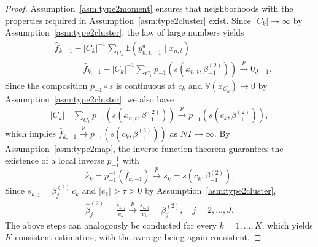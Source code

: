 \documentclass[preprint,12pt,authoryear]{elsarticle}
\newcommand{\pto}{\xrightarrow{p}}
\newcommand{\E}{\mathbb{E}}
\newcommand{\Var}{\mathbb{V}}
\begin{document}
\begin{proof}
Assumption~\ref{asm:type2moment} ensures that neighborhoods with the properties required in Assumption~\ref{asm:type2cluster} exist. Since $\lvert C_k \rvert \to \infty$ by Assumption~\ref{asm:type2cluster}, the law of large numbers yields
%
\begin{align*}
&\hat{f}_{k,-1} - \lvert C_k \rvert^{-1} \sum_{C_k} \E(y_{n,t,-1}^d \mid x_{n,t}) \\
&\qquad = \hat{f}_{k,-1} - \lvert C_k \rvert^{-1} \sum_{C_k} p_{-1}(s(x_{n,t}, \beta_{-1}^{(2)})) \pto 0_{J-1}.
\end{align*}
%
Since the composition $p_{-1} \circ s$ is continuous at $c_k$ and $\Var(x_{C_k}) \to 0$ by Assumption~\ref{asm:type2cluster}, we also have
%
\begin{align*}
     \lvert C_k \rvert^{-1} \sum_{C_k} p_{-1}(s(x_{n,t}, \beta_{-1}^{(2)})) \pto p_{-1}(s(c_k, \beta_{-1}^{(2)})),
\end{align*}
%
which implies $\hat{f}_{k,-1} \pto p_{-1}(s(c_k, \beta_{-1}^{(2)}))$ as $NT \to \infty$. By Assumption~\ref{asm:type2map}, the inverse function theorem guarantees the existence of a local inverse $p_{-1}^{-1}$ with $$\hat{s}_k = p_{-1}^{-1}(\hat{f}_{k,-1}) \pto s_{k} = s(c_k, \beta_{-1}^{(2)}).$$ Since $s_{k,j}=\beta^{(2)}_j\,c_k$ and $\lvert c_k \rvert > \tau > 0$ by Assumption~\ref{asm:type2cluster},
%
\begin{align*}
    \hat{\beta}_j^{(2)} = \frac{\hat{s}_{k,j}}{c_k} \pto \frac{s_{k,j}}{c_k} = \beta^{(2)}_j, \quad j = 2,\dots,J.
\end{align*}
%
The above steps can analogously be conducted for every $k = 1,\dots,K$, which yields $K$ consistent estimators, with the average being again consistent.
\end{proof}
\end{document}

